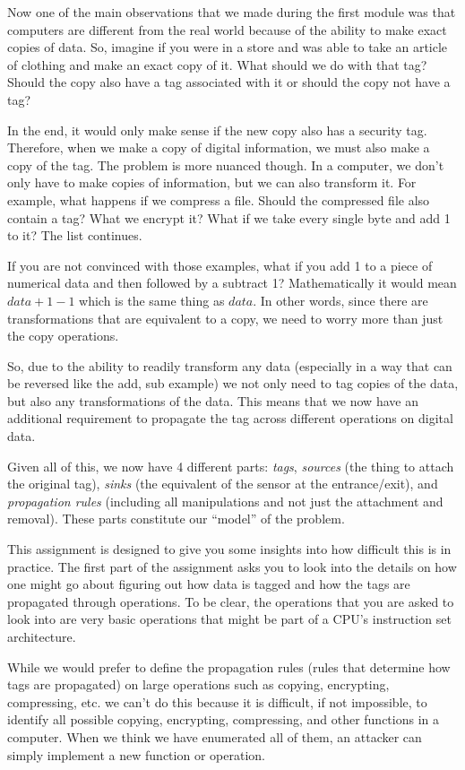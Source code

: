 Now one of the main observations that we made during the first module was that computers are
different from the real world because of the ability to make exact copies of data. So, imagine if you were
in a store and was able to take an article of clothing and make an exact copy of it. What should we do
with that tag? Should the copy also have a tag associated with it or should the copy not have a tag?

In the end, it would only make sense if the new copy also has a security tag. Therefore, when we make a
copy of digital information, we must also make a copy of the tag. The problem is more nuanced though.
In a computer, we don’t only have to make copies of information, but we can also transform it. For
example, what happens if we compress a file. Should the compressed file also contain a tag? What we
encrypt it? What if we take every single byte and add 1 to it? The list continues.

If you are not convinced with those examples, what if you add 1 to a piece of numerical data and then
followed by a subtract 1? Mathematically it would mean $data + 1 - 1$ which is the same thing as $data$. In other
words, since there are transformations that are equivalent to a copy, we need to worry more than just
the copy operations.

So, due to the ability to readily transform any data (especially in a way that can be reversed like the add,
sub example) we not only need to tag copies of the data, but also any transformations of the data. This
means that we now have an additional requirement to propagate the tag across different operations on
digital data.

Given all of this, we now have 4 different parts: {\em tags}, {\em sources} (the thing to attach the original tag), {\em sinks}
(the equivalent of the sensor at the entrance/exit), and {\em propagation rules} (including all manipulations
and not just the attachment and removal). These parts constitute our ``model'' of the problem.

This assignment is designed to give you some insights into how difficult this is in practice. The first part
of the assignment asks you to look into the details on how one might go about figuring out how data is
tagged and how the tags are propagated through operations. To be clear, the operations that you are
asked to look into are very basic operations that might be part of a CPU’s instruction set architecture.

While we would prefer to define the propagation rules (rules that determine how tags are propagated)
on large operations such as copying, encrypting, compressing, etc. we can’t do this because it is difficult,
if not impossible, to identify all possible copying, encrypting, compressing, and other functions in a
computer. When we think we have enumerated all of them, an attacker can simply implement a new
function or operation.

